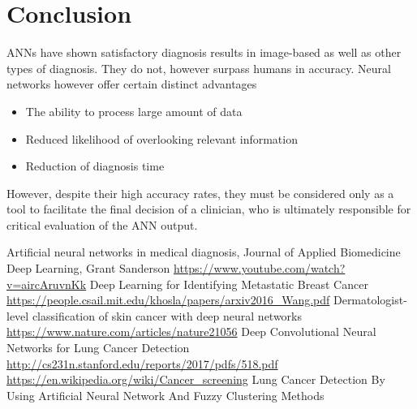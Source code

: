 \documentclass[11pt,a4paper]{article}
\begin{document}
\section{Conclusion}

ANNs have shown satisfactory diagnosis results in image-based as well as other types of diagnosis. They do not, however surpass humans in accuracy.
Neural networks however offer certain distinct advantages
\begin{itemize}
	\item The ability to process large amount of data
	\item Reduced likelihood of overlooking relevant information
	\item Reduction of diagnosis time
\end{itemize}
\cite{havel}
However, despite their high accuracy rates, they must be considered only as a tool to facilitate the final decision of a clinician, who is ultimately responsible for critical evaluation of the ANN output.

\begin{thebibliography}{99}
Artificial neural networks in medical diagnosis, Journal of Applied Biomedicine
Deep Learning, Grant Sanderson \url{https://www.youtube.com/watch?v=aircAruvnKk}
Deep Learning for Identifying Metastatic Breast Cancer \url{https://people.csail.mit.edu/khosla/papers/arxiv2016_Wang.pdf}
Dermatologist-level classification of skin cancer with deep neural networks \url{https://www.nature.com/articles/nature21056}
Deep Convolutional Neural Networks for Lung Cancer Detection \url{http://cs231n.stanford.edu/reports/2017/pdfs/518.pdf}
 \url{https://en.wikipedia.org/wiki/Cancer_screening}
Lung Cancer Detection By Using Artificial Neural Network And Fuzzy Clustering Methods
\end{thebibliography}
\end{document}
